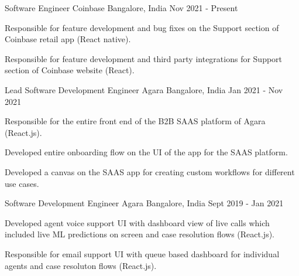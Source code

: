 

\begin{cventries}

  \cventry
    {Software Engineer} %
    {Coinbase} %
    {Bangalore, India} %
    {Nov 2021 - Present} %
    {
      \begin{cvitems} %
        \item {Responsible for feature development and bug fixes on the Support section of Coinbase retail app (React native).}
        \item {Responsible for feature development and third party integrations for Support section of Coinbase website (React).}
      \end{cvitems}
    }

  \cventry
    {Lead Software Development Engineer} %
    {Agara} %
    {Bangalore, India} %
    {Jan 2021 - Nov 2021} %
    {
      \begin{cvitems} %
        \item {Responsible for the entire front end of the B2B SAAS platform of Agara (React.js).}
        \item {Developed entire onboarding flow on the UI of the app for the SAAS platform.}
        \item {Developed a canvas on the SAAS app for creating custom workflows for different use cases.}
      \end{cvitems}
    }

  \cventry
    {Software Development Engineer} %
    {Agara} %
    {Bangalore, India} %
    {Sept 2019 - Jan 2021} %
    {
      \begin{cvitems} %
        \item {Developed agent voice support UI with dashboard view of live calls which included live ML predictions on screen and case resolution flows (React.js).}
        \item {Responsible for email support UI with queue based dashboard for individual agents and case resoluton flows (React.js).}
      \end{cvitems}
    }


\end{cventries}
